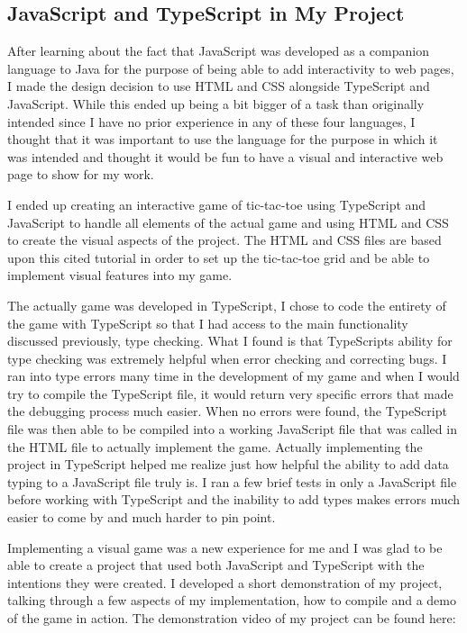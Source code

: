 \documentclass{article}
\theoremstyle{theorem}
\theoremstyle{definition}
\theoremstyle{remark}
\begin{document}
\subsection{JavaScript and TypeScript in My Project}

After learning about the fact that JavaScript was developed as a companion language to Java for the purpose of being able to add interactivity to web pages, I made the design decision to use HTML and CSS alongside TypeScript and JavaScript. While this ended up being a bit bigger of a task than originally intended since I have no prior experience in any of these four languages, I thought that it was important to use the language for the purpose in which it was intended and thought it would be fun to have a visual and interactive web page to show for my work.

I ended up creating an interactive game of tic-tac-toe using TypeScript and JavaScript to handle all elements of the actual game and using HTML and CSS to create the visual aspects of the project. The HTML and CSS files are based upon this cited tutorial \cite{18} in order to set up the tic-tac-toe grid and be able to implement visual features into my game.

The actually game was developed in TypeScript, I chose to code the entirety of the game with TypeScript so that I had access to the main functionality discussed previously, type checking. What I found is that TypeScripts ability for type checking was extremely helpful when error checking and correcting bugs. I ran into type errors many time in the development of my game and when I would try to compile the TypeScript file, it would return very specific errors that made the debugging process much easier. When no errors were found, the TypeScript file was then able to be compiled into a working JavaScript file that was called in the HTML file to actually implement the game. Actually implementing the project in TypeScript helped me realize just how helpful the ability to add data typing to a JavaScript file truly is. I ran a few brief tests in only a JavaScript file before working with TypeScript and the inability to add types makes errors much easier to come by and much harder to pin point.

Implementing a visual game was a new experience for me and I was glad to be able to create a project that used both JavaScript and TypeScript with the intentions they were created. I developed a short demonstration of my project, talking through a few aspects of my implementation, how to compile and a demo of the game in action. The demonstration video of my project can be found here: \cite{Final Project Demo Video}
\end{document}
